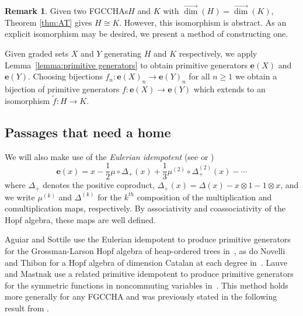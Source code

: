 \documentclass[11pt]{amsart}
\theoremstyle{definition}
\newtheorem{remark}[theorem]{Remark}
\numberwithin{equation}{section}
\newcommand{\FGCCHA}{\textsf{FGCCHA}\xspace}
\newcommand{\FGCCHAs}{\textsf{FGCCHA}s\xspace}
\newcommand{\vecdim}{\overrightarrow{\dim}}
\begin{document}
\begin{remark}
    Given two \FGCCHAs $H$ and $K$ with $\vecdim(H) = \vecdim(K)$, Theorem \ref{thm:AT} gives $H \cong K$. However, this isomorphism is abstract. As an explicit isomorphism may be desired, we present a method of constructing one. 
    
    Given graded sets $X$ and $Y$ generating $H$ and $K$ respectively, we apply Lemma~\ref{lemma:primitive generators} to obtain primitive generators $\mathbf{e}(X)$ and $\mathbf{e}(Y)$. Choosing bijections $f_n:\mathbf{e}(X)_n \to \mathbf{e}(Y)_n$ for all $n \geq 1$ we obtain a bijection of primitive generators $f:\mathbf{e}(X) \to \mathbf{e}(Y)$ which extends to an isomorphism $\tilde{f}:H \to K$.
\end{remark}

\subsection{Passages that need a home}

We will also make use of the \emph{Eulerian idempotent} (see \cite[\S 1.4]{AS05cc} or \cite[\S 4.5.2]{loday2013cyclic})
\[
\mathbf{e}(x) = x - \frac{1}{2}\mu \circ \Delta_{+}(x) + \frac{1}{3} \mu^{(2)} \circ \Delta_{+}^{(2)}(x) - \cdots 
\]
where $\Delta_{+}$ denotes the positive coproduct, $\Delta_{+}(x) = \Delta(x) - x \otimes 1 - 1 \otimes x$,
and we write $\mu^{(k)}$ and $\Delta^{(k)}$ for the $k^{th}$
composition of the multiplication and comultiplication maps, respectively.
By associativity and coassociativity of the Hopf algebra, these maps are well defined.

Aguiar and Sottile use the Eulerian idempotent to produce primitive generators for the Grossman-Larson
Hopf algebra of heap-ordered trees in~\cite{AS05cc},
as do Novelli and Thibon for a Hopf algebra of dimension Catalan at each degree in~\cite[\S 5]{NT05}.
Lauve and Mastnak use a related primitive idempotent to produce primitive generators for
the symmetric functions in noncommuting variables in~\cite{LM11}.
This method holds more generally for any \FGCCHA and was previously stated in the following result from \cite{PR04}.
\end{document}
